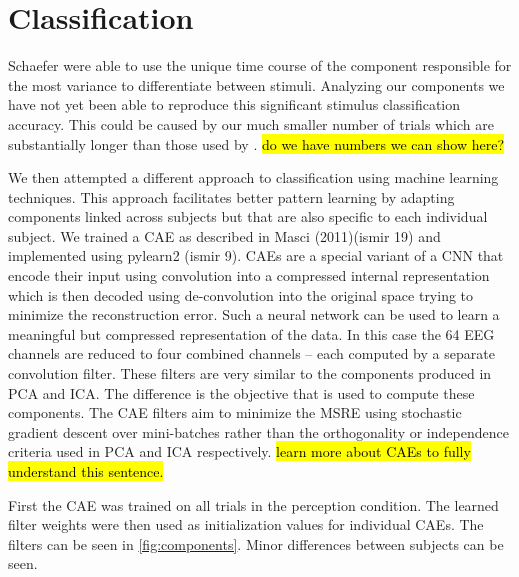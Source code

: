 \section*{Classification}
Schaefer \etal \cite{schaefer_name_2011} were able to use the unique time course of the component responsible for the most variance to differentiate between stimuli.
Analyzing our components we have not yet been able to reproduce this significant stimulus classification accuracy. 
This could be caused by our much smaller number of trials which are substantially longer than those used by \cite{schaefer_name_2011}. 
\hl{do we have numbers we can show here?}

We then attempted a different approach to classification using machine learning techniques. This approach facilitates better pattern learning by adapting components linked across subjects but that are also specific to each individual subject. 
We trained a \ac{CAE} as described in Masci (2011)(ismir 19) and implemented using pylearn2 (ismir 9). 
CAEs are a special variant of a \ac{CNN} that encode their input using convolution into a compressed internal representation which is then decoded using de-convolution into the original space trying to minimize the reconstruction error. 
Such a neural network can be used to learn a meaningful but compressed representation of the data. 
In this case the 64 \ac{EEG} channels are reduced to four combined channels -- each computed by a separate convolution filter. 
These filters are very similar to the components produced in \ac{PCA} and \ac{ICA}. 
The difference is the objective that is used to compute these components. 
The \ac{CAE} filters aim to minimize the \ac{MSRE} using stochastic gradient descent over mini-batches rather than the orthogonality or independence criteria used in \ac{PCA} and \ac{ICA} respectively. 
\hl{learn more about CAEs to fully understand this sentence.}

First the \ac{CAE} was trained on all trials in the perception condition. The learned filter weights were then used as initialization values for individual \ac{CAE}s. 
The filters can be seen in \autoref{fig:components}. 
Minor differences between subjects can be seen. 

